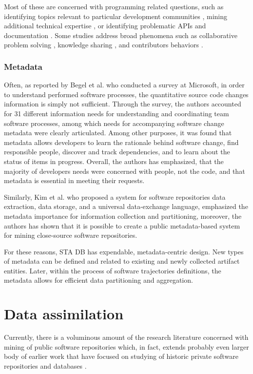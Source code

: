 Most of these are concerned with programming related questions, such as identifying topics relevant to particular 
development communities \cite{kartik:msr14}, mining additional technical expertise \cite{VenkataramaniGAMB13} \cite{SaxeMG13}, 
or identifying problematic APIs \cite{KavalerPGCDF13} \cite{Linares2013Exploratory} and documentation \cite{Campbell2013Deficient}.
Some studies address broad phenomena such as collaborative problem solving \cite{Tausczik2014Collaborative},
knowledge sharing \cite{VasilescuCSCW14} \cite{Schenk2013Geo}, and contributors behaviors \cite{Bosu2013Building} \cite{GinscaP13}.

\subsubsection{Metadata}
Often, as reported by Begel et al. \cite{citeulike:7260421} who conducted a survey at Microsoft, in order to understand performed 
software processes, the quantitative source code changes information is simply not sufficient. 
Through the survey, the authors accounted for 31 different information needs for understanding and coordinating team software 
processes, among which needs for accompanying software change metadata were clearly articulated. 
Among other purposes, it was found that metadata allows developers to learn the rationale behind software change,
find responsible people, discover and track dependencies, and to learn about the status of items in progress. 
Overall, the authors has emphasized, that the majority of developers needs were concerned with people, not the code, 
and that metadata is essential in meeting their requests.

Similarly, Kim et al. \cite{citeulike:4000311} who proposed a system for software repositories data extraction, data storage, 
and a universal data-exchange language, emphasized the metadata importance for information collection and partitioning, moreover, 
the authors has shown that it is possible to create a public metadata-based system for mining close-source software repositories.

For these reasons, STA DB has expendable, metadata-centric design. New types of metadata can be defined and related to existing 
and newly collected artifact entities. Later, within the process of software trajectories definitions, the metadata allows for efficient 
data partitioning and aggregation.

\section{Data assimilation}
Currently, there is a voluminous amount of the research literature concerned with mining of public software repositories 
\cite{citeulike:2710928} which, in fact, extends probably even larger body of earlier work that have focused on studying 
of historic private software repositories and databases \cite{citeulike:393158} \cite{citeulike:13125375} \cite{citeulike:13125481}.

